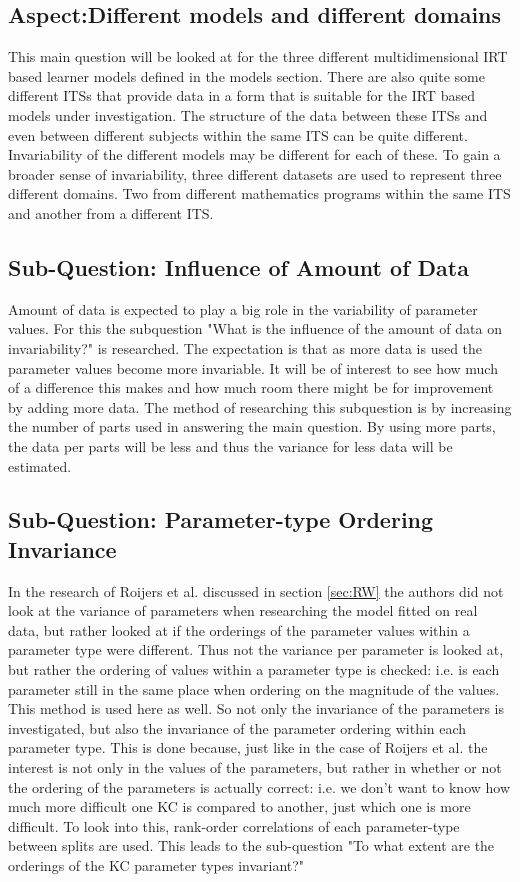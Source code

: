 \documentclass{scrartcl}
\begin{document}
\subsection{Aspect:Different models and different domains}
This main question will be looked at for the three different multidimensional IRT based learner models defined in the models section. There are also quite some different ITSs that provide data in a form that is suitable for the IRT based models under investigation. The structure of the data between these ITSs and even between different subjects within the same ITS can be quite different. Invariability of the different models may be different for each of these. To gain a broader sense of invariability, three different datasets are used to represent three different domains. Two from different mathematics programs within the same ITS and another from a different ITS.

\subsection{Sub-Question: Influence of Amount of Data}
Amount of data is expected to play a big role in the variability of parameter values. For this the subquestion "What is the influence of the amount of data on invariability?" is researched. The expectation is that as more data is used the parameter values become more invariable. It will be of interest to see how much of a difference this makes and how much room there might be for improvement by adding more data. The method of researching this subquestion is by increasing the number of parts used in answering the main question. By using more parts, the data per parts will be less and thus the variance for less data will be estimated.

\subsection{Sub-Question: Parameter-type Ordering Invariance}
In the research of Roijers et al. discussed in section \ref{sec:RW} the authors did not look at the variance of parameters when researching the model fitted on real data, but rather looked at if the orderings of the parameter values within a parameter type were different. Thus not the variance per parameter is looked at, but rather the ordering of values within a parameter type is checked: i.e. is each parameter still in the same place when ordering on the magnitude of the values. This method is used here as well. So not only the invariance of the parameters is investigated, but also the invariance of the parameter ordering within each parameter type. This is done because, just like in the case of Roijers et al. the interest is not only in the values of the parameters, but rather in whether or not the ordering of the parameters is actually correct: i.e. we don't want to know how much more difficult one KC is compared to another, just which one is more difficult. To look into this, rank-order correlations of each parameter-type between splits are used. This leads to the sub-question "To what extent are the orderings of the KC parameter types invariant?" 
\end{document}
